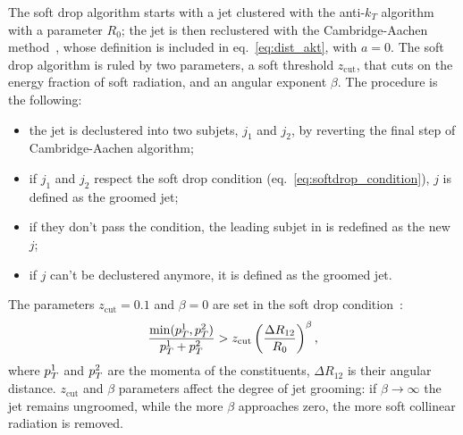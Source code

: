 \noindent The soft drop algorithm starts with a jet clustered with the anti-$k_T$ algorithm with a parameter $R_0$; the jet is then reclustered with the Cambridge-Aachen method~\cite{Dokshitzer:1997in}, whose definition is included in eq.~\ref{eq:dist_akt}, with $a=0$. The soft drop algorithm is ruled by two parameters, a soft threshold $z_{\text{cut}}$, that cuts on the energy fraction of soft radiation, and an angular exponent $\beta$. The procedure is the following:
\begin{itemize}
\item the jet is declustered into two subjets, $j_1$ and $j_2$, by reverting the final step of Cambridge-Aachen algorithm;
\item if $j_1$ and $j_2$ respect the soft drop condition (eq.~\ref{eq:softdrop_condition}), $j$ is defined as the groomed jet;
\item if they don't pass the condition, the leading subjet in \pt is redefined as the new $j$;
\item if $j$ can't be declustered anymore, it is defined as the groomed jet.
\end{itemize}

\noindent The parameters $z_{\text{cut}} = 0.1$ and $\beta = 0$ are set in the soft drop condition~\cite{Larkoski:2014wba}:
\begin{equation}
\frac{\min(p_T^1,p_T^2)}{p_T^1+p_T^2} > z_{\text{cut}} \left( \frac{\Delta R_{12}}{R_0} \right)^\beta,
\label{eq:softdrop_condition}
\end{equation}
\noindent where $p_T^1$ and $p_T^2$ are the momenta of the constituents, $\Delta R_{12}$ is their angular distance. $z_{\text{cut}}$ and $\beta$ parameters affect the degree of jet grooming: if $\beta \to \infty$ the jet remains ungroomed, while the more $\beta$ approaches zero, the more soft collinear radiation is removed. %

